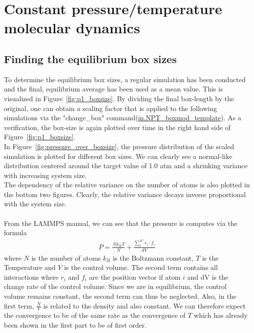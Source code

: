 \documentclass[10pt,a4paper]{report}
\def \pathpartone {../../1_three-dimensional_atomic_system}
\begin{document}
\section{Constant pressure/temperature molecular dynamics}
\subsection{Finding the equilibrium box sizes}
To determine the equilibrium box sizes, a regular simulation has been conducted and the final, equilibrium average has been used as a mean value. This is visualized in Figure~\ref{fig:p1_boxsize}. By dividing the final box-length by the original, one can obtain a scaling factor that is applied to the following simulations via the "change\_box" command(\href{\pathpartone/in.NPT_boxmod_template}{in.NPT\_boxmod\_template}).
As a verification, the box-size is again plotted over time in the right hand side of Figure~\ref{fig:p1_boxsize}.\\

In Figure~\ref{fig:pressure_over_boxsize}, the pressure distribution of the scaled simulation is plotted for different box sizes. We can clearly see a normal-like distribution centered around the target value of 1.0 atm and a shrinking variance with increasing system size.\\
The dependency of the relative variance on the number of atoms is also plotted in the bottom two figures. Clearly, the relative variance decays inverse proportional with the system size.\\
 \\
From the LAMMPS manual, we can see that the pressure is computes via the formula
\begin{align}
P=\frac{N k_B T}{N}+\frac{\sum_i^{N'}r_i\cdot f_i}{dV}
\end{align}
where $N$ is the number of atoms $k_B$ is the Boltzmann constant, $T$ is the Temperature and $V$ is the control volume. The second term contains all interactions where $r_i$ and $f_i$ are the position vector if atom $i$ and dV is the change rate of the control volume. Since we are in equilibrium, the control volume remains constant, the second term can thus be neglected. Also, in the first term, $\frac{N}{V}$ is related to the density and also constant. We can therefore expect the convergence to be of the same rate as the convergence of $T$ which has already been shown in the first part to be of first order.
\end{document}
